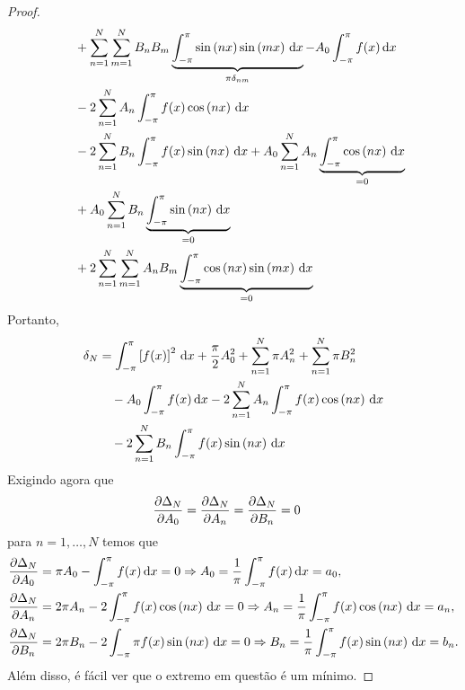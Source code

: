 \begin{proof}
\begin{align*}
\begin{split}
            &\quad {}+ \sum_{n = 1}^N \sum_{m = 1}^N B_n B_m \underbrace{\int_{-\pi}^\pi \sin\left( n x \right) \sin\left( m x \right) \, \mathrm{d}x}_{\pi \delta_{nm}} - A_0 \int_{-\pi}^\pi f(x) \, \mathrm{d}x \\
            &\quad {}- 2 \sum_{n = 1}^N A_n \int_{-\pi}^\pi f(x) \cos\left( n x \right) \, \mathrm{d}x \\
            &\quad {}- 2 \sum_{n = 1}^N B_n \int_{-\pi}^\pi f(x) \sin\left( n x \right) \, \mathrm{d}x + A_0 \sum_{n = 1}^N A_n \underbrace{\int_{-\pi}^\pi \cos\left( n x \right) \, \mathrm{d}x}_{=0} \\
            &\quad {}+ A_0 \sum_{n = 1}^N B_n \underbrace{\int_{-\pi}^\pi \sin\left( n x \right) \, \mathrm{d}x}_{=0} \\
            &\quad {}+ 2 \sum_{n = 1}^N \sum_{m = 1}^N A_n B_m \underbrace{\int_{-\pi}^\pi \cos\left( n x \right) \sin\left( m x \right) \, \mathrm{d}x}_{=0}
        \end{split}
    \end{align*}
    Portanto,
    \begin{align*}
        \begin{split}
            \delta_N &= \int_{-\pi}^\pi \left[ f(x) \right]^2 \, \mathrm{d}x + \frac{\pi}{2} A_0^2 + \sum_{n = 1}^N \pi A_n^2 + \sum_{n = 1}^N \pi B_n^2 \\
            &\quad {}- A_0 \int_{-\pi}^\pi f(x) \, \mathrm{d}x - 2 \sum_{n = 1}^N A_n \int_{-\pi}^\pi f(x) \cos\left( n x \right) \, \mathrm{d}x \\
            &\quad {}- 2 \sum_{n = 1}^N B_n \int_{-\pi}^\pi f(x) \sin\left( n x \right) \, \mathrm{d}x
        \end{split}
    \end{align*}
    Exigindo agora que
    \begin{align*}
        \frac{\partial \Delta_N}{\partial A_0} &= \frac{\partial \Delta_N}{\partial A_n} = \frac{\partial \Delta_N}{\partial B_n} = 0
    \end{align*}
    para $n = 1, \ldots, N$ temos que
    \begin{align*}
        & \frac{\partial \Delta_N}{\partial A_0} = \pi A_0 - \int_{-\pi}^\pi f(x) \, \mathrm{d}x = 0 \Rightarrow A_0 = \frac{1}{\pi} \int_{-\pi}^\pi f(x) \, \mathrm{d}x = a_0, \\
        & \frac{\partial \Delta_N}{\partial A_n} = 2 \pi A_n - 2 \int_{-\pi}^\pi f(x) \cos\left( n x \right) \, \mathrm{d}x = 0 \Rightarrow A_n = \frac{1}{\pi} \int_{-\pi}^\pi f(x) \cos\left( n x \right) \, \mathrm{d}x = a_n, \\
        & \frac{\partial \Delta_N}{\partial B_n} = 2 \pi B_n - 2 \int_{-\pi} \pi f(x) \sin\left( n x \right) \, \mathrm{d}x = 0 \Rightarrow B_n = \frac{1}{\pi} \int_{-\pi}^\pi f(x) \sin\left( n x \right) \, \mathrm{d}x = b_n.
    \end{align*}
    Al\'{e}m disso, \'{e} f\'{a}cil ver que o extremo em quest\~{a}o \'{e} um m\'{i}nimo.
\end{proof}

